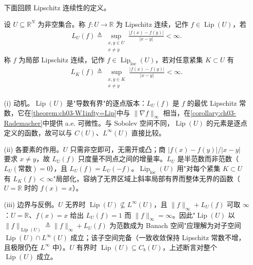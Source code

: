 \documentclass[../../main.tex]{subfiles}%
\begin{document}
下面回顾 Lipschitz 连续性的定义。

\begin{definition}\label{definition:ch03-Lipschitz}
设 $U\subseteq\mathbb{R}^N$ 为非空集合。称 $f:U\to\mathbb{R}$ 为 Lipschitz 连续，记作 $f\in\operatorname{Lip}(U)$，若
\begin{align*}
L_U(f)\triangleq \sup_{\substack{x,y\in U\\x\neq y}}\frac{|f(x)-f(y)|}{|x-y|}<\infty.
\end{align*}
称 $f$ 为局部 Lipschitz 连续，记作 $f\in\operatorname{Lip}_{\mathrm{loc}}(U)$，若对任意紧集 $K\subset U$ 有
\begin{align*}
L_K(f)\triangleq \sup_{\substack{x,y\in K\\x\neq y}}\frac{|f(x)-f(y)|}{|x-y|}<\infty.
\end{align*}
\end{definition}

\begin{remark}\label{remark:ch03-Lipschitz动机}
(i) 动机。$\operatorname{Lip}(U)$ 是"导数有界"的逐点版本：$L_U(f)$ 是 $f$ 的最优 Lipschitz 常数，它在\cref{theorem:ch03-W1infty=Lip}中与 $\|\nabla f\|_\infty$ 相当，在\cref{corollary:ch03-Rademacher}中提供 a.e. 可微性。与 Sobolev 空间不同，$\operatorname{Lip}(U)$ 的元素是逐点定义的函数，故可以与 $C(U)$、$L^\infty(U)$ 直接比较。

(ii) 各要素的作用。$U$ 只需非空即可，无需开或凸；商 $|f(x)-f(y)|/|x-y|$ 要求 $x\neq y$，故 $L_U(f)$ 只度量不同点之间的增量率。$L_U$ 是半范数而非范数（$L_U(\text{常数})=0$），且 $L_U(f)=L_U(-f)$。$\operatorname{Lip}_{\mathrm{loc}}(U)$ 用"对每个紧集 $K\subset U$ 有 $L_K(f)<\infty$"局部化，容纳了无界区域上斜率局部有界而整体无界的函数（$U=\mathbb{R}$ 时的 $f(x)=x$）。

(iii) 边界与反例。$U$ 无界时 $\operatorname{Lip}(U)\not\subseteq L^\infty(U)$，且 $\|f\|_\infty+L_U(f)$ 可取 $\infty$：$U=\mathbb{R}$、$f(x)=x$ 给出 $L_U(f)=1$ 而 $\|f\|_\infty=\infty$。因此"$\operatorname{Lip}(U)$ 以 $\|f\|_{\operatorname{Lip}(U)}\triangleq\|f\|_\infty+L_U(f)$ 为范数成为 Banach 空间"应理解为对子空间 $\operatorname{Lip}(U)\cap L^\infty(U)$ 成立；该子空间完备（一致收敛保持 Lipschitz 常数不增，且极限仍在 $L^\infty$ 中）。$U$ 有界时 $\operatorname{Lip}(U)\subseteq C_b(U)$，上述断言对整个 $\operatorname{Lip}(U)$ 成立。
\end{remark}
\end{document}

